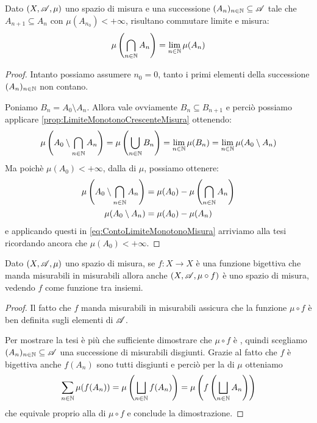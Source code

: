\begin{corollary}\label{cor:LimiteMonotonoDecrescenteMisura}
	Dato $(X,\mathscr A,\mu)$ uno spazio di misura e una successione $(A_n)_{n\in\mathbb N}\subseteq \mathscr A$ tale che $A_{n+1}\subseteq A_n$ con $\mu(A_{n_0})<+\infty$, risultano commutare limite e misura:
	\begin{equation*}
		\mu\left(\bigcap_{n\in\mathbb N} A_n\right)=\lim_{n\in\mathbb N} \mu(A_n)
	\end{equation*}
\end{corollary}
\begin{proof}
	Intanto possiamo assumere $n_0=0$, tanto i primi elementi della successione $(A_n)_{n\in\mathbb N}$ non contano.
	
	Poniamo $B_n=A_0\setminus A_n$. Allora vale ovviamente $B_n\subseteq B_{n+1}$ e perciò possiamo applicare \cref{prop:LimiteMonotonoCrescenteMisura} ottenendo:
	\begin{equation}\label{eq:ContoLimiteMonotonoMisura}
		\mu\left(A_0\setminus\bigcap_{n\in\mathbb N}A_n\right)=\mu\left(\bigcup_{n\in\mathbb N}B_n\right)=\lim_{n\in\mathbb N}\mu(B_n)
		=\lim_{n\in\mathbb N}\mu(A_0\setminus A_n)
	\end{equation}
	Ma poichè $\mu(A_0)<+\infty$, dalla \sigadd[ità] di $\mu$, possiamo ottenere:
	\begin{align*}
		\mu\left(A_0\setminus\bigcap_{n\in\mathbb N}A_n\right)&=\mu(A_0)-\mu\left(\bigcap_{n\in\mathbb N}A_n\right)\\
		\mu(A_0\setminus A_n)&=\mu(A_0)-\mu(A_n)
	\end{align*}
	e applicando questi in \cref{eq:ContoLimiteMonotonoMisura} arriviamo alla tesi ricordando ancora che $\mu(A_0)<+\infty$.
\end{proof}

\begin{proposition}\label{prop:BigettivaInduceMisura}
	Dato $(X,\mathscr A,\mu)$ uno spazio di misura, se $f:X\to X$ è una funzione bigettiva che manda misurabili in misurabili allora anche $(X,\mathscr A,\mu\circ f)$ è uno spazio di misura, vedendo $f$ come funzione tra insiemi.
\end{proposition}
\begin{proof}
	Il fatto che $f$ manda misurabili in misurabili assicura che la funzione $\mu\circ f$ è ben definita sugli elementi di $\mathscr A$.
	
	Per mostrare la tesi è più che sufficiente dimostrare che $\mu\circ f$ è \sigadd{}, quindi scegliamo $(A_n)_{n\in\mathbb N}\subseteq\mathscr A$ una successione di misurabili disgiunti.
	Grazie al fatto che $f$ è bigettiva anche $f(A_n)$ sono tutti disgiunti e perciò per la \sigadd[ità] di $\mu$ otteniamo
	\begin{equation*}
		\sum_{n\in\mathbb N}\mu(f(A_n))=\mu\left(\bigsqcup_{n\in\mathbb N}f(A_n)\right)=\mu\left(f\left(\bigsqcup_{n\in\mathbb N}A_n\right)\right)
	\end{equation*}
	che equivale proprio alla \sigadd[ità] di $\mu\circ f$ e conclude la dimostrazione.
\end{proof}



